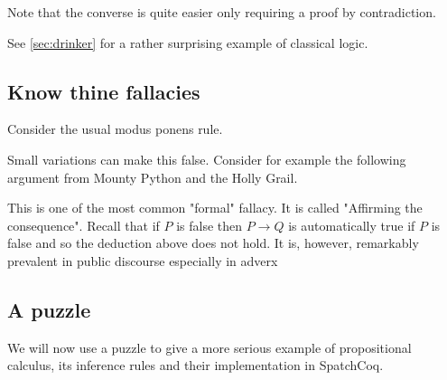 Note that the converse is quite easier only requiring  a proof by contradiction.



See \ref{sec:drinker} for a rather surprising example of classical logic.

\subsection{Know thine fallacies}

Consider the usual modus ponens rule. 

Small variations can make this false.
 Consider for example the following argument from Mounty Python and the Holly Grail.
 
 
 
 
 
 
 This is one of the most common "formal" fallacy. It is called "Affirming the consequence". Recall that if $P$ is false then $P\rightarrow Q$ is automatically true if $P$ is false and so the deduction above does not hold. It is, however, remarkably prevalent in public discourse especially in adverx

\subsection{A puzzle}

We will now use a puzzle to give a more serious example	 of propositional calculus, its inference rules and their implementation in SpatchCoq. 

